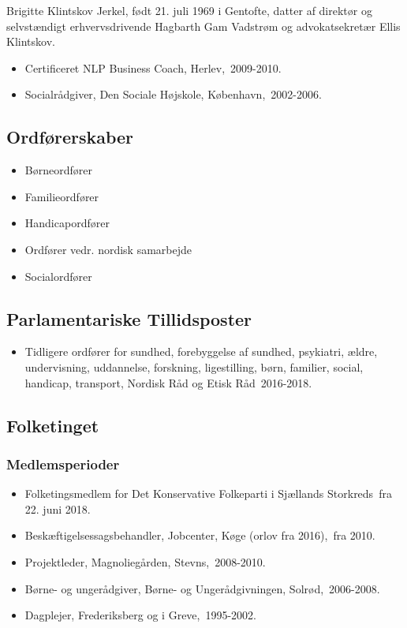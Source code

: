 \documentclass[11pt, a4paper]{awesome-cv}
\begin{document}
\makecvheader[R]
\makelettertitle
\begin{cvletter}
Brigitte Klintskov Jerkel, født 21. juli 1969 i Gentofte, datter af direktør og selvstændigt erhvervsdrivende Hagbarth Gam Vadstrøm og advokatsekretær Ellis Klintskov.

\begin{itemize}
\item Certificeret NLP Business Coach, Herlev, 2009-2010.
\item Socialrådgiver, Den Sociale Højskole, København, 2002-2006.
\end{itemize}
\subsection*{Ordførerskaber}
\begin{itemize}
\item Børneordfører
\item Familieordfører
\item Handicapordfører
\item Ordfører vedr. nordisk samarbejde
\item Socialordfører
\end{itemize}
\subsection*{Parlamentariske Tillidsposter}
\begin{itemize}
\item Tidligere ordfører for sundhed, forebyggelse af sundhed, psykiatri, ældre, undervisning, uddannelse, forskning, ligestilling, børn, familier, social, handicap, transport, Nordisk Råd og Etisk Råd 2016-2018.
\end{itemize}
\subsection*{Folketinget}
\subsubsection*{Medlemsperioder}
\begin{itemize}
\item Folketingsmedlem for Det Konservative Folkeparti i Sjællands Storkreds fra 22. juni 2018.
\end{itemize}
\begin{itemize}
\item Beskæftigelsessagsbehandler, Jobcenter, Køge (orlov fra 2016), fra 2010.
\item Projektleder, Magnoliegården, Stevns, 2008-2010.
\item Børne- og ungerådgiver, Børne- og Ungerådgivningen, Solrød, 2006-2008.
\item Dagplejer, Frederiksberg og i Greve, 1995-2002.
\end{itemize}
\end{cvletter}
\end{document}
